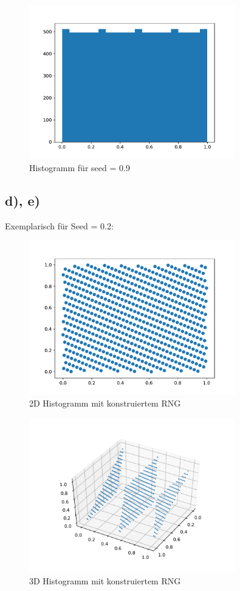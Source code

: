 \begin{figure}[H]
  \centering
  \includegraphics[width=0.8\textwidth]{nr8_c_seed=0.9.pdf}
  \caption{Histogramm für seed = 0.9}
\end{figure}

\subsection{d), e)}
Exemplarisch für Seed = 0.2:

\begin{figure}[H]
  \centering
  \includegraphics[width=0.8\textwidth]{nr8_d_2D_seed=0.2.pdf}
  \caption{2D Histogramm mit konstruiertem RNG}
\end{figure}

\begin{figure}[H]
  \centering
  \includegraphics[width=0.8\textwidth]{nr8_d_3D_seed=0.2.pdf}
  \caption{3D Histogramm mit konstruiertem RNG}
\end{figure}

